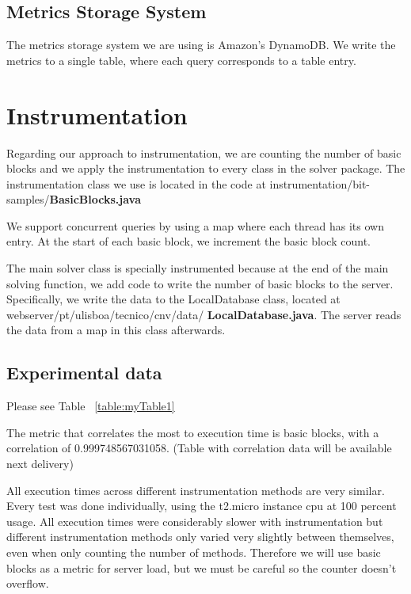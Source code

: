 \documentclass[10pt,twocolumn]{article}
\begin{document}
\subsection*{Metrics Storage System}

The metrics storage system we are using is Amazon's DynamoDB. We write the metrics to a single table, where each query corresponds to a table entry.

\section{Instrumentation}

Regarding our approach to instrumentation, we are counting the number of basic blocks and we apply the instrumentation to every class in the solver package.
The instrumentation class we use is located in the code at instrumentation/bit-samples/\textbf{BasicBlocks.java}

We support concurrent queries by using a map where each thread has its own entry.
At the start of each basic block, we increment the basic block count.

The main solver class is specially instrumented because at the end of the main solving function, we add code to write the number of basic blocks to the server.
Specifically, we write the data to the LocalDatabase class, located at webserver/pt/ulisboa/tecnico/cnv/data/ \textbf{LocalDatabase.java}.
The server reads the data from a map in this class afterwards.

\subsection{Experimental data}


Please see Table ~\ref{table:myTable1}

The metric that correlates the most to execution time is basic blocks, with a correlation of 0.999748567031058. (Table with correlation data will be available next delivery)

All execution times across different instrumentation methods are very similar.
Every test was done individually, using the t2.micro instance cpu at 100 percent usage.
All execution times were considerably slower with instrumentation but different instrumentation methods only varied very slightly between themselves, even when only counting the number of methods.
Therefore we will use basic blocks as a metric for server load, but we must be careful so the counter doesn’t overflow.
\end{document}
